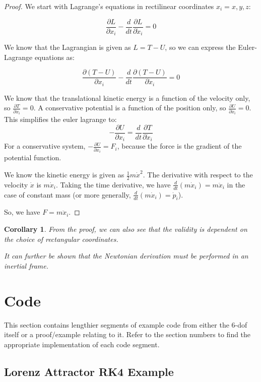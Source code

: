 \documentclass[12pt]{report}
\newtheorem{corollary}{Corollary}[theorem]
\begin{document}
\begin{proof}
We start with Lagrange's equations in rectilinear coordinates $x_i=x,y,z$:

$$\frac{\partial L}{\partial x_i}-\frac{d}{dt}\frac{\partial L}{\partial \dot{x}_i}=0 $$

We know that the \gls{Lagrangian} is given as $L=T-U$, so we can express the Euler-Lagrange equations as:

$$\frac{\partial (T-U)}{\partial x_i}-\frac{d}{dt}\frac{\partial (T-U)}{\partial \dot{x}_i}=0$$

We know that the translational kinetic energy is a function of the velocity only, so $\frac{\partial T}{\partial x_i}=0$. A \gls{conservative} potential is a function of the position only, so $\frac{\partial U}{\partial \dot{x}_i}=0$. This simplifies the \gls{euler lagrange} to:
$$-\frac{\partial U}{\partial x_i}=\frac{d}{dt}\frac{\partial T}{\partial \dot{x}_i}$$
For a \gls{conservative} system, $-\frac{\partial U}{\partial x_i}=F_i$, because the force is the gradient of the potential function.

We know the kinetic energy is given as $\frac{1}{2}m\dot{x}^2$. The derivative with respect to the velocity $\dot{x}$ is $m\dot{x}_i$. Taking the time derivative, we have $\frac{d}{dt}(m\dot{x}_i)=m\ddot{x}_i$ in the case of constant mass (or more generally,  $\frac{d}{dt}(m\dot{x}_i)=\dot{p}_i$).

So, we have $F=m\ddot{x}_i$.

\end{proof}
\begin{corollary}
    From the proof, we can also see that the validity is dependent on the choice of rectangular coordinates. 

    It can further be shown that the Newtonian derivation must be performed in an inertial frame.
\end{corollary}


\section{Code}
This section contains lengthier segments of example code from either the 6-\gls{dof} itself or a proof/example relating to it. Refer to the section numbers to find the appropriate implementation of each code segment.
\subsection{Lorenz Attractor RK4 Example}\label{sec:Lorenz Attractor RK4 Example}
\label{code:Lorenz}
\end{document}
